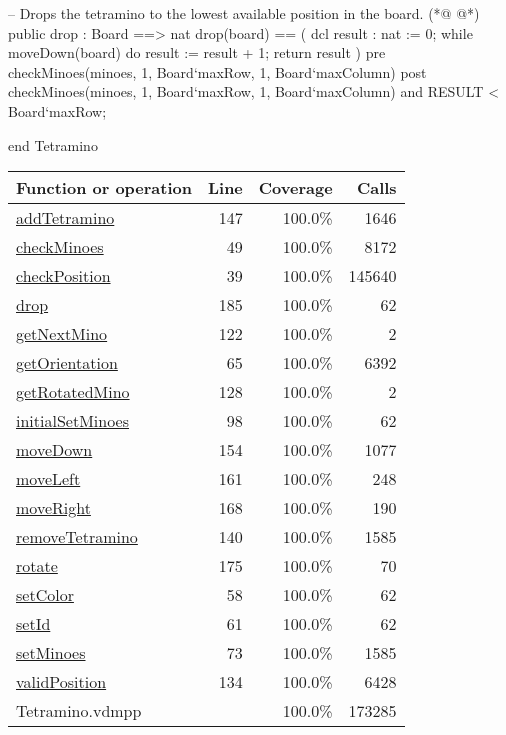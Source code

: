 \begin{vdmpp}[breaklines=true]
  -- Drops the tetramino to the lowest available position in the board.
(*@
\label{drop:185}
@*)
  public drop : Board ==> nat
  drop(board) == (
   dcl result : nat := 0;
   while moveDown(board) do 
    result := result + 1;
   return result
  )
  pre checkMinoes(minoes, 1, Board`maxRow, 1, Board`maxColumn)
  post checkMinoes(minoes, 1, Board`maxRow, 1, Board`maxColumn) 
   and RESULT < Board`maxRow;
  
end Tetramino
\end{vdmpp}
\bigskip
\begin{longtable}{|l|r|r|r|}
\hline
Function or operation & Line & Coverage & Calls \\
\hline
\hline
\hyperref[addTetramino:147]{addTetramino} & 147&100.0\% & 1646 \\
\hline
\hyperref[checkMinoes:49]{checkMinoes} & 49&100.0\% & 8172 \\
\hline
\hyperref[checkPosition:39]{checkPosition} & 39&100.0\% & 145640 \\
\hline
\hyperref[drop:185]{drop} & 185&100.0\% & 62 \\
\hline
\hyperref[getNextMino:122]{getNextMino} & 122&100.0\% & 2 \\
\hline
\hyperref[getOrientation:65]{getOrientation} & 65&100.0\% & 6392 \\
\hline
\hyperref[getRotatedMino:128]{getRotatedMino} & 128&100.0\% & 2 \\
\hline
\hyperref[initialSetMinoes:98]{initialSetMinoes} & 98&100.0\% & 62 \\
\hline
\hyperref[moveDown:154]{moveDown} & 154&100.0\% & 1077 \\
\hline
\hyperref[moveLeft:161]{moveLeft} & 161&100.0\% & 248 \\
\hline
\hyperref[moveRight:168]{moveRight} & 168&100.0\% & 190 \\
\hline
\hyperref[removeTetramino:140]{removeTetramino} & 140&100.0\% & 1585 \\
\hline
\hyperref[rotate:175]{rotate} & 175&100.0\% & 70 \\
\hline
\hyperref[setColor:58]{setColor} & 58&100.0\% & 62 \\
\hline
\hyperref[setId:61]{setId} & 61&100.0\% & 62 \\
\hline
\hyperref[setMinoes:73]{setMinoes} & 73&100.0\% & 1585 \\
\hline
\hyperref[validPosition:134]{validPosition} & 134&100.0\% & 6428 \\
\hline
\hline
Tetramino.vdmpp & & 100.0\% & 173285 \\
\hline
\end{longtable}

